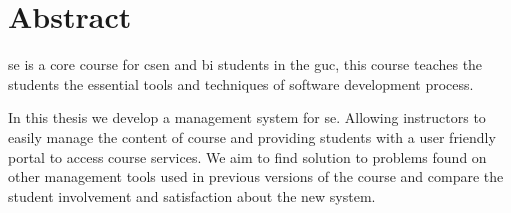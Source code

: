 \chapter*{Abstract}
\label{chap:abstract}

\ac{se} is a core course for \ac{csen} and \ac{bi} students in the \ac{guc},
this course teaches the students the essential tools and techniques of software development process.

\newParagraph
In this thesis we develop a management system for \ac{se}. Allowing instructors to easily manage the content of course and
providing students with a user friendly portal to access course services. We aim to find solution to problems found on
other management tools used in previous versions of the course and compare the student involvement and satisfaction about the new system.
